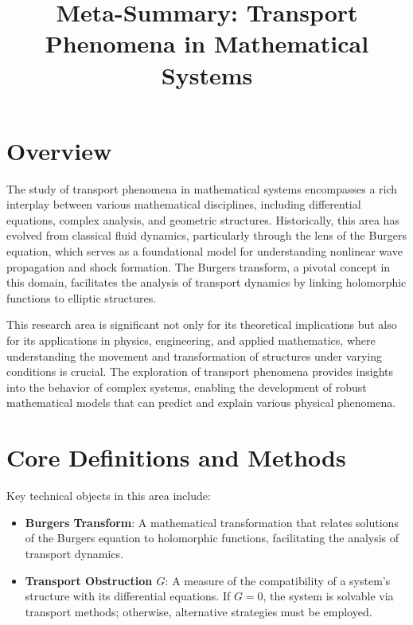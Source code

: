 \documentclass[11pt,a4paper]{article}
\title{Meta-Summary: Transport Phenomena in Mathematical Systems}
\date{}
\begin{document}
\maketitle

\section{Overview}

The study of transport phenomena in mathematical systems encompasses a rich interplay between various mathematical disciplines, including differential equations, complex analysis, and geometric structures. Historically, this area has evolved from classical fluid dynamics, particularly through the lens of the Burgers equation, which serves as a foundational model for understanding nonlinear wave propagation and shock formation. The Burgers transform, a pivotal concept in this domain, facilitates the analysis of transport dynamics by linking holomorphic functions to elliptic structures.

This research area is significant not only for its theoretical implications but also for its applications in physics, engineering, and applied mathematics, where understanding the movement and transformation of structures under varying conditions is crucial. The exploration of transport phenomena provides insights into the behavior of complex systems, enabling the development of robust mathematical models that can predict and explain various physical phenomena.

\section{Core Definitions and Methods}

Key technical objects in this area include:

\begin{itemize}
\item \textbf{Burgers Transform}: A mathematical transformation that relates solutions of the Burgers equation to holomorphic functions, facilitating the analysis of transport dynamics.
\end{itemize}

\begin{itemize}
\item \textbf{Transport Obstruction \( G \)}: A measure of the compatibility of a system's structure with its differential equations. If \( G = 0 \), the system is solvable via transport methods; otherwise, alternative strategies must be employed.
\end{itemize}
\end{document}
